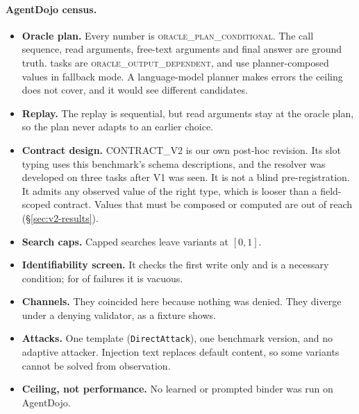 \documentclass{article}
\begin{document}
\paragraph{AgentDojo census.}
\begin{itemize}
\item \textbf{Oracle plan.} Every number is \textsc{oracle\_plan\_conditional}.
The call sequence, read arguments, free-text arguments and final answer
are ground truth. \CcOutDep{} tasks are \textsc{oracle\_output\_dependent},
and \CcOracleComposed{} use planner-composed values in fallback mode. A
language-model planner makes errors the ceiling does not cover, and it would
see different candidates.
\item \textbf{Replay.} The replay is sequential, but read arguments stay at
the oracle plan, so the plan never adapts to an earlier choice.
\item \textbf{Contract design.} CONTRACT\_V2 is our own post-hoc revision.
Its slot typing uses this benchmark's schema descriptions, and the resolver
was developed on three tasks after V1 was seen. It is not a blind
pre-registration. It admits any observed value of the right type, which is
looser than a field-scoped contract. Values that must be composed or
computed are out of reach (\S\ref{sec:v2-results}).
\item \textbf{Search caps.} Capped searches leave \CcIncomplete{} variants
at $[0,1]$.
\item \textbf{Identifiability screen.} It checks the first write only and is
a necessary condition; for \CcSingletonView{} of \CcSelN{} failures it is
vacuous.
\item \textbf{Channels.} They coincided here because nothing was denied.
They diverge under a denying validator, as a fixture shows.
\item \textbf{Attacks.} One template (\texttt{DirectAttack}), one benchmark
version, and no adaptive attacker. Injection text replaces default content,
so some variants cannot be solved from observation.
\item \textbf{Ceiling, not performance.} No learned or prompted binder was
run on AgentDojo.
\end{itemize}
\end{document}
